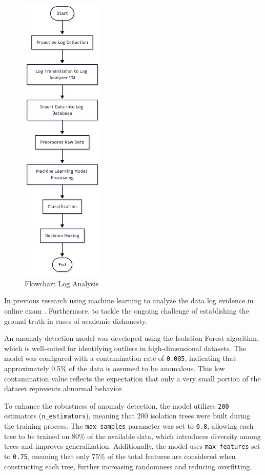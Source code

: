 \begin{figure}[H] 
	\centering
	\includegraphics[height=14cm]{figure/flow-analysis-data.png}
	\caption{Flowchart Log Analysis }
	\label{fig:flow-analysis-log}
\end{figure}

In previous research using machine learning to analyze the data log evidence in online exam \citet{garg2023preserving}. Furthermore, to tackle the ongoing challenge of establishing the ground truth in cases of academic dishonesty.

An anomaly detection model was developed using the Isolation Forest algorithm, which is well-suited for identifying outliers in high-dimensional datasets. The model was configured with a contamination rate of \texttt{0.005}, indicating that approximately 0.5\% of the data is assumed to be anomalous. This low contamination value reflects the expectation that only a very small portion of the dataset represents abnormal behavior.

To enhance the robustness of anomaly detection, the model utilizes \texttt{200} estimators (\texttt{n\_estimators}), meaning that 200 isolation trees were built during the training process. The \texttt{max\_samples} parameter was set to \texttt{0.8}, allowing each tree to be trained on 80\% of the available data, which introduces diversity among trees and improves generalization. Additionally, the model uses \texttt{max\_features} set to \texttt{0.75}, meaning that only 75\% of the total features are considered when constructing each tree, further increasing randomness and reducing overfitting.


